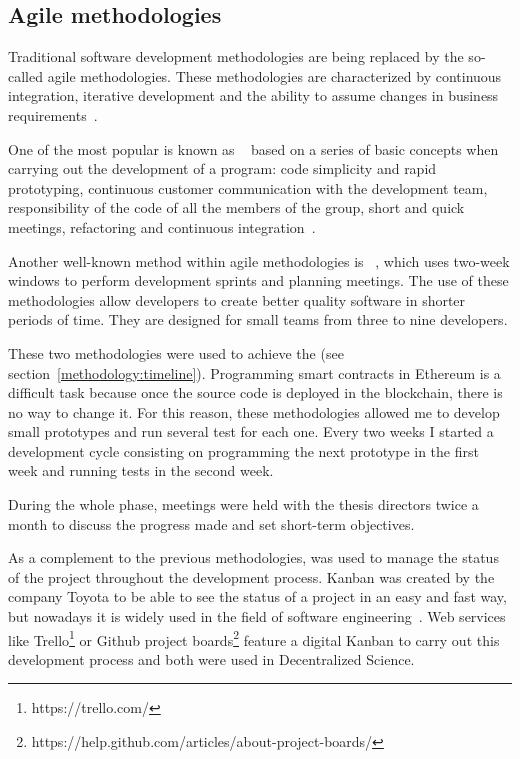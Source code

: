 \subsection{Agile methodologies}
\label{sec:agile-methodologies}

Traditional software development methodologies are being replaced by the
so-called agile methodologies. These methodologies are characterized by continuous
integration, iterative development and the ability to assume changes in business
requirements~\cite{boehm2005management,livermore2008factors}.

One of the most popular is known as ~\cite{lindstrom2004extreme} based on a series of basic concepts
when carrying out the development of a program: code simplicity and rapid
prototyping, continuous customer communication with the development team,
responsibility of the code of all the members of the group, short and quick
meetings, refactoring and continuous integration~\cite{theunissen2005search}.

Another well-known method within agile methodologies is
~\cite{rising2000scrum}, which uses two-week windows to perform
development sprints and planning meetings. The use of these methodologies allow
developers to create better quality software in shorter periods of time. They are
designed for small teams from three to nine developers.

These two methodologies were used to achieve the 
(see section~\ref{methodology:timeline}). Programming smart contracts in
Ethereum is a difficult task because once the source code is deployed in the
blockchain, there is no way to change it. For this reason, these methodologies
allowed me to develop small prototypes and run several test for each one. Every
two weeks I started a development cycle consisting on programming the next
prototype in the first week and running tests in the second week.

During the whole  phase, meetings were held with the
thesis directors twice a month to discuss the progress made and set
short-term objectives.

As a complement to the previous methodologies,  was used to manage
the status of the project throughout the development process. Kanban was created
by the company Toyota to be able to see the status of a project in an easy and
fast way, but nowadays it is widely used in the field of software
engineering~\cite{ahmad2013kanban}. Web services like
Trello\footnote{https://trello.com/} or Github project
boards\footnote{https://help.github.com/articles/about-project-boards/} feature
a digital Kanban to carry out this development process and both were used in
Decentralized Science.

